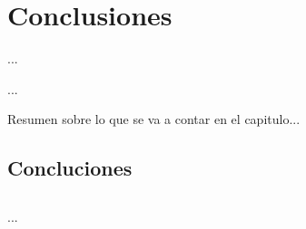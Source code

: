 
%
%

\chapter{Conclusiones}

\begin{FraseCelebre}
\begin{Frase}
...
\end{Frase}
\begin{Fuente}
...
\end{Fuente}
\end{FraseCelebre}

\begin{resumen}
Resumen sobre lo que se va a contar en el capitulo...
\end{resumen}


\section{Concluciones}
\label{cap32:sec:Conclusiones}


\section*{\ProximoCapitulo}
\TocProximoCapitulo

...








